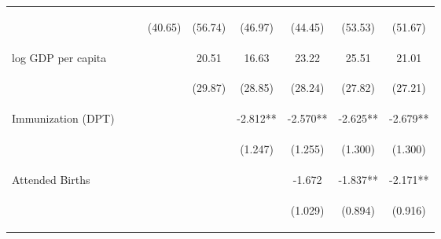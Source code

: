 \begin{landscape}
\begin{table}[htpb!]
\begin{center}
\begin{tabular}{lcccccccc}
&&&\begin{footnotesize}(40.65)\end{footnotesize}&\begin{footnotesize}(56.74)\end{footnotesize}&\begin{footnotesize}(46.97)\end{footnotesize}&\begin{footnotesize}(44.45)\end{footnotesize}&\begin{footnotesize}(53.53)\end{footnotesize}&\begin{footnotesize}(51.67)\end{footnotesize}\\
log GDP per capita&&&&20.51&16.63&23.22&25.51&21.01\\
&&&&\begin{footnotesize}(29.87)\end{footnotesize}&\begin{footnotesize}(28.85)\end{footnotesize}&\begin{footnotesize}(28.24)\end{footnotesize}&\begin{footnotesize}(27.82)\end{footnotesize}&\begin{footnotesize}(27.21)\end{footnotesize}\\
Immunization (DPT) &&&&&-2.812**&-2.570**&-2.625**&-2.679**\\
&&&&&\begin{footnotesize}(1.247)\end{footnotesize}&\begin{footnotesize}(1.255)\end{footnotesize}&\begin{footnotesize}(1.300)\end{footnotesize}&\begin{footnotesize}(1.300)\end{footnotesize}\\
Attended Births&&&&&&-1.672&-1.837**&-2.171**\\
&&&&&&\begin{footnotesize}(1.029)\end{footnotesize}&\begin{footnotesize}(0.894)\end{footnotesize}&\begin{footnotesize}(0.916)\end{footnotesize}\\

\end{tabular}
\end{center}
\end{table}
\end{landscape}
